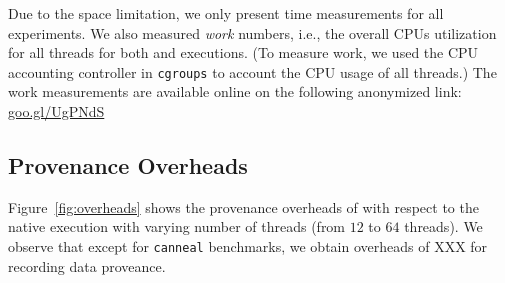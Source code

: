  Due to the space limitation, we only present  time measurements for all experiments. We also measured  {\em work} numbers, i.e., the overall CPUs utilization for all threads for both \pthreads and \projecttitle executions. (To measure work, we used the CPU accounting controller in {\tt cgroups} to account the CPU usage of all threads.) The work measurements are available online on the following anonymized link:  \href{https://goo.gl/UgPNdS}{goo.gl/UgPNdS}





\subsection{Provenance Overheads}
\label{subsec:overheads}

Figure~\ref{fig:overheads} shows the provenance overheads of \projecttitle with respect to the native \pthreads execution with varying number of
threads (from $12$ to $64$ threads). We observe that except for {\tt canneal} benchmarks, we
  obtain overheads of XXX for recording data proveance.  
  
